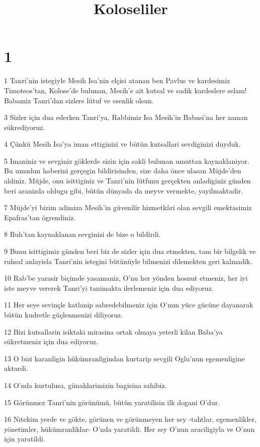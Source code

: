 

\title{Koloseliler}


\chapter{1}

\par 1 Tanri'nin istegiyle Mesih Isa'nin elçisi atanan ben Pavlus ve kardesimiz Timoteos'tan, Kolose'de bulunan, Mesih'e ait kutsal ve sadik kardeslere selam! Babamiz Tanri'dan sizlere lütuf ve esenlik olsun.
\par 3 Sizler için dua ederken Tanri'ya, Rabbimiz Isa Mesih'in Babasi'na her zaman sükrediyoruz.
\par 4 Çünkü Mesih Isa'ya iman ettiginizi ve bütün kutsallari sevdiginizi duyduk.
\par 5 Imaniniz ve sevginiz göklerde sizin için sakli bulunan umuttan kaynaklaniyor. Bu umudun haberini gerçegin bildirisinden, size daha önce ulasan Müjde'den aldiniz. Müjde, onu isittiginiz ve Tanri'nin lütfunu gerçekten anladiginiz günden beri aranizda oldugu gibi, bütün dünyada da meyve vermekte, yayilmaktadir.
\par 7 Müjde'yi bizim adimiza Mesih'in güvenilir hizmetkâri olan sevgili emektasimiz Epafras'tan ögrendiniz.
\par 8 Ruh'tan kaynaklanan sevginizi de bize o bildirdi.
\par 9 Bunu isittigimiz günden beri biz de sizler için dua etmekten, tam bir bilgelik ve ruhsal anlayisla Tanri'nin istegini bütünüyle bilmenizi dilemekten geri kalmadik.
\par 10 Rab'be yarasir biçimde yasamaniz, O'nu her yönden hosnut etmeniz, her iyi iste meyve vererek Tanri'yi tanimakta ilerlemeniz için dua ediyoruz.
\par 11 Her seye sevinçle katlanip sabredebilmeniz için O'nun yüce gücüne dayanarak bütün kudretle güçlenmenizi diliyoruz.
\par 12 Bizi kutsallarin isiktaki mirasina ortak olmaya yeterli kilan Baba'ya sükretmeniz için dua ediyoruz.
\par 13 O bizi karanligin hükümranligindan kurtarip sevgili Oglu'nun egemenligine aktardi.
\par 14 O'nda kurtulusa, günahlarimizin bagisina sahibiz.
\par 15 Görünmez Tanri'nin görünümü, bütün yaratilisin ilk dogani O'dur.
\par 16 Nitekim yerde ve gökte, görünen ve görünmeyen her sey -tahtlar, egemenlikler, yönetimler, hükümranliklar- O'nda yaratildi. Her sey O'nun araciligiyla ve O'nun için yaratildi.
